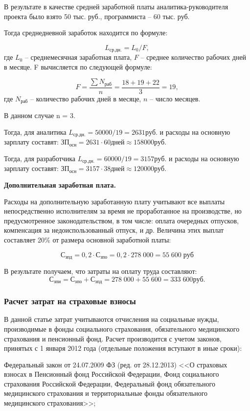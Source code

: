 В результате в качестве средней заработной платы аналитика-руководителя проекта было взято 50 тыс. руб., программиста – 60 тыс. руб.

Тогда среднедневной заработок находится по формуле:

$$L_{ср.дн.}=L_{0}/F,$$ 
где $L_{0}$ – среднемесячная заработная плата, $F$ – среднее количество рабочих дней в месяце. F вычисляется по следующей формуле:

$$ F = \frac{\sum N_{раб}}{n} = \frac{18+19+22}{3} = 19,$$
где $N_{раб}$ – количество рабочих дней в месяце, $n$ – число месяцев.

В данном случае n = 3.

Тогда, для аналитика $L_{ср.дн.}= 50 000 / 19 = 2 631 руб.$ и расходы на основную зарплату составят: $ЗП_{осн} = 2 631 \cdot 60 дней \approx 158 000 руб.$

Тогда, для разработчика  $ L_{ср.дн.}= 60 000 / 19 = 3 157 руб.$ и расходы на основную зарплату составят: $ЗП_{осн} = 3 157 \cdot 38 дней \approx 120 000 руб.$

\textbf{Дополнительная  заработная плата.}

Расходы на дополнительную заработанную плату учитывают все выплаты непосредственно исполнителям за время не проработанное на производстве, но предусмотренное законодательством, в том числе: оплата очередных отпусков, компенсация за недоиспользованный отпуск, и др. Величина этих выплат составляет 20\% от размера основной заработной платы:

$$С_{зпд} = 0,2 \cdot С_{зпо} = 0,2 \cdot 278\;000 = 55\;600 \; руб$$

В результате получаем, что  затраты на  оплату труда составляют:
$$С_{зпи} = С_{зпо} + С_{зпд} = 278\;000 + 55\;600 = 333\;600 руб.$$

\subsubsection{Расчет затрат на  страховые взносы}

В данной статье затрат учитываются отчисления на социальные нужды, производимые в фонды социального страхования, обязательного медицинского страхования и пенсионный фонд. Расчет производится с учетом законов, принятых с 1 января 2012 года (отдельные положения вступают в иные сроки):

Федеральный закон от 24.07.2009   ФЗ (ред. от 28.12.2013) <<О страховых взносах в Пенсионный фонд Российской Федерации, Фонд социального страхования Российской Федерации, Федеральный фонд обязательного медицинского страхования и территориальные фонды обязательного медицинского страхования>>;

